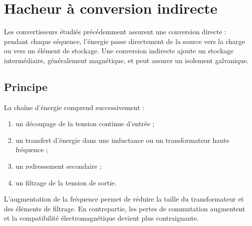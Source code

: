 
\section{Hacheur à conversion indirecte}

Les convertisseurs étudiés précédemment assurent une conversion directe : pendant chaque séquence, l'énergie passe directement de la source vers la charge ou vers un élément de stockage. Une conversion indirecte ajoute un stockage intermédiaire, généralement magnétique, et peut assurer un isolement galvanique.

\subsection{Principe}

La chaîne d'énergie comprend successivement :
\begin{enumerate}
\item un découpage de la tension continue d'entrée ;
\item un transfert d'énergie dans une inductance ou un transformateur haute fréquence ;
\item un redressement secondaire ;
\item un filtrage de la tension de sortie.
\end{enumerate}

\begin{center}
\end{center}

L'augmentation de la fréquence permet de réduire la taille du transformateur et des éléments de filtrage. En contrepartie, les pertes de commutation augmentent et la compatibilité électromagnétique devient plus contraignante.

